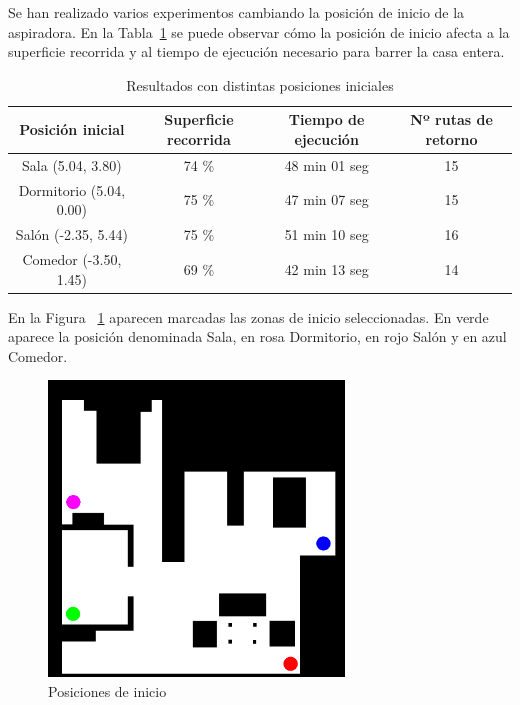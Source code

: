 Se han realizado varios experimentos cambiando la posición de inicio de la aspiradora. En la Tabla~\ref{table:resultados} se puede observar cómo la posición de inicio afecta a la superficie recorrida y al tiempo de ejecución necesario para barrer la casa entera.

\begin{table}[h!]
\centering
\caption{Resultados con distintas posiciones iniciales}
\begin{tabular}{|c|c|c|c|}
\hline
\textbf{Posición inicial}  & \textbf{Superficie recorrida} & \textbf{Tiempo de ejecución}  & \textbf{Nº rutas de retorno} \\ 
\hline
Sala (5.04, 3.80)    & 74 \%                        & 48 min 01 seg                         & 15\\ 
\hline
Dormitorio (5.04, 0.00)         & 75 \%                        & 47 min 07 seg    						& 15\\ 
\hline
Salón (-2.35, 5.44)          & 75 \%                        & 51 min 10 seg    						& 16\\ 
\hline
Comedor (-3.50, 1.45)      & 69 \%                        & 42 min 13 seg    						& 14\\ 
\hline
\end{tabular}

\label{table:resultados}
\end{table}

En la Figura ~\ref{fig.posInicio} aparecen marcadas las zonas de inicio seleccionadas. En verde aparece la posición denominada Sala, en rosa Dormitorio, en rojo Salón y en azul Comedor.

\begin{figure}[H]
  \begin{center}
    \includegraphics[width=0.7\textwidth]{figures/Vacuum/mapaPosInicio.png}
		\caption{Posiciones de inicio}
		\label{fig.posInicio}
		\end{center}
\end{figure}


